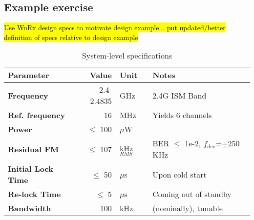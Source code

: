 \subsection{Example exercise}
\hl{Use WuRx design specs to motivate design example... put updated/better definition of specs relative to design example}
\begin{table}[h!]
	\centering
	\def\arraystretch{1.5}		
	\setlength\arrayrulewidth{0.75pt}
	\setlength{\tabcolsep}{1em} %
	\begin{tabular}{|l|r|l|l|}
		\hline 
		\rule[-1ex]{0pt}{2.5ex} \cellcolor{gray!40}\textbf{Parameter} & \cellcolor{gray!40}\textbf{Value} & \cellcolor{gray!40}\textbf{Unit }& \cellcolor{gray!40}\textbf{Notes}\\ 
		\hline 
		\rule[-1ex]{0pt}{2.5ex} \textbf{Frequency}  & 2.4-2.4835 & GHz & 2.4G ISM Band\\ 
		\hline 
		\rule[-1ex]{0pt}{2.5ex} \textbf{Ref. frequency} & 16 & MHz & Yields 6 channels \\ 
		\hline 
		\rule[-1ex]{0pt}{2.5ex} \textbf{Power} & $\leq$ 100  &$\mu$W & \\ 
		\hline 
		\rule[-1ex]{0pt}{2.5ex} \textbf{Residual FM} & $\leq$ 107  &kHz$_{RMS}$ & BER $\leq$ 1e-2, $f_{dev}$=$\pm$250 KHz\\ 
		\hline 
		\rule[-1ex]{0pt}{2.5ex} \textbf{Initial Lock Time} & $\leq$ 50 & $\mu$s & Upon cold start \\ 
		\hline 
		\rule[-1ex]{0pt}{2.5ex} \textbf{Re-lock Time} & $\leq$ 5 & $\mu$s & Coming out of standby \\ 
		\hline 
		\rule[-1ex]{0pt}{2.5ex} \textbf{Bandwidth} & 100 & kHz & (nominally), tunable \\ 
		\hline 
	\end{tabular} 
	\caption{System-level specifications}
\end{table}   

